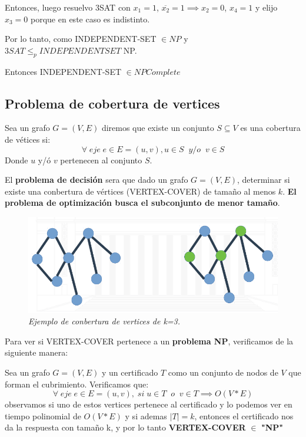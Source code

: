 \documentclass{article}
\begin{document}
Entonces, luego resuelvo 3SAT con \(x_1 = 1\), \(\overline{x_2} = 1 \implies x_2=0\), 
\(x_4=1\) y elijo \(x_3=0\) porque en este caso es indistinto.

Por lo tanto, como INDEPENDENT-SET \(\in NP\) y \(3SAT \leq_p INDEPENDENTSET\) NP.

Entonces INDEPENDENT-SET \(\in NPComplete\)

\newpage
\subsection{Problema de cobertura de vertices}
Sea un grafo \(G=(V,E)\) diremos que existe un conjunto \(S \subseteq V\) es una cobertura de vétices si:
\[
    \forall \;eje\; e \in E=(u,v), u\in S \;\; y/o \;\; v \in S
\]
Donde \(u\) y/ó \(v\) pertenecen al conjunto \(S\).

El \textbf{problema de decisión} sera que dado un grafo \(G=(V,E)\), determinar si existe una conbertura
de vértices (VERTEX-COVER) de tamaño al menos \(k\). 
\textbf{El problema de optimización busca el subconjunto de menor tamaño}.


\begin{figure}[h!]
    \begin{center} 
    \includegraphics[width=\linewidth]{imagenes/ejemplo-cobertura-v-k3.png}
    \caption{\small \sl Ejemplo de conbertura de vertices de k=3.\label{fig:Stupendous}} 
    \end{center}
\end{figure}

Para ver si VERTEX-COVER pertenece a un \textbf{problema NP}, verificamos de la siguiente manera: 

Sea un grafo \(G=(V,E)\) y un certificado \(T\) como un conjunto de nodos de \(V\) que forman el cubrimiento. 
Verificamos que:
\[
    \forall \;eje\; e \in E=(u,v), \; si \; u\in T \;\; o \;\; v \in T \implies O(V*E)
\]
observamos si uno de estos vertices pertenece al certificado y lo podemos ver en tiempo polinomial de \(O(V*E)\) y si ademas \(|T|=k\), 
entonces el certificado nos da la respuesta con tamaño k, y por lo tanto \textbf{VERTEX-COVER} \(\in\) \textbf{"NP"}
\end{document}
